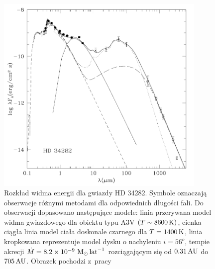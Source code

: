 \begin{figure}
   \includegraphics[width=0.9\textwidth]{figures/chap1_sed.png}
   \caption{Rozkład widma energii dla gwiazdy HD 34282. Symbole oznaczają
      obserwacje różnymi metodami dla odpowiednich długości fali. Do obserwacji
      dopasowano następujące modele: linia przerywana model widma gwiazdowego
      dla obiektu typu A3V $(T\sim 8600\hbox{$\thinspace\textrm{K}$})$, cienka ciągła
      linia model ciała doskonale czarnego dla $T=1400\hbox{$\thinspace\textrm{K}$}$,
      linia kropkowana reprezentuje model dysku o nachyleniu $i=56^o$, tempie
      akrecji $\dot{M} = 8.2\times10^{-9}\thinspace\hbox{$\mathrm{\thinspace M_{\odot}}$}\hbox{$\thinspace\textrm{lat}$}^{-1}$
      rozciągającym się od $0.31\hbox{$\thinspace\textrm{AU}$}$ do $705\hbox{$\thinspace\textrm{AU}$}$.
   Obrazek pochodzi z~pracy~\cite{MME04}}
   \label{fig:sed}
\end{figure}

